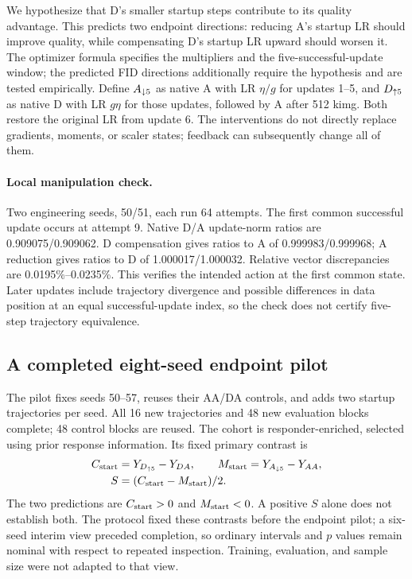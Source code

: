 We hypothesize that D's smaller startup steps contribute to its quality advantage. This predicts two endpoint directions: reducing A's startup LR should improve quality, while compensating D's startup LR upward should worsen it. The optimizer formula specifies the multipliers and the five-successful-update window; the predicted FID directions additionally require the hypothesis and are tested empirically. Define $A_{\downarrow 5}$ as native A with LR $\eta/g$ for updates 1--5, and $D_{\uparrow 5}$ as native D with LR $g\eta$ for those updates, followed by A after 512 kimg. Both restore the original LR from update 6. The interventions do not directly replace gradients, moments, or scaler states; feedback can subsequently change all of them.

\paragraph{Local manipulation check.}
Two engineering seeds, 50/51, each run 64 attempts. The first common successful update occurs at attempt 9. Native D/A update-norm ratios are 0.909075/0.909062. D compensation gives ratios to A of 0.999983/0.999968; A reduction gives ratios to D of 1.000017/1.000032. Relative vector discrepancies are 0.0195\%--0.0235\%. This verifies the intended action at the first common state. Later updates include trajectory divergence and possible differences in data position at an equal successful-update index, so the check does not certify five-step trajectory equivalence.

\subsection{A completed eight-seed endpoint pilot}
\label{sec:pilot}
The pilot fixes seeds 50--57, reuses their AA/DA controls, and adds two startup trajectories per seed. All 16 new trajectories and 48 new evaluation blocks complete; 48 control blocks are reused. The cohort is responder-enriched, selected using prior response information. Its fixed primary contrast is
\begin{align}
 C_{\rm start}&=Y_{D_{\uparrow 5}}-Y_{DA},\qquad M_{\rm start}=Y_{A_{\downarrow 5}}-Y_{AA},\\
 S&=(C_{\rm start}-M_{\rm start})/2.
 \label{eq:startupcontrasts}
\end{align}
The two predictions are $C_{\rm start}>0$ and $M_{\rm start}<0$. A positive $S$ alone does not establish both. The protocol fixed these contrasts before the endpoint pilot; a six-seed interim view preceded completion, so ordinary intervals and $p$ values remain nominal with respect to repeated inspection. Training, evaluation, and sample size were not adapted to that view.

